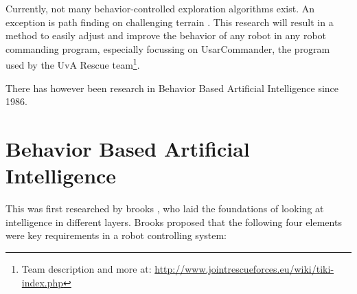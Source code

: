 \documentclass[a4paper,10pt]{article}
\begin{document}
Currently, not many behavior-controlled exploration algorithms exist.
An exception is path finding on challenging terrain
\cite{seraji2002behavior} . This research will result in a method to
easily adjust and improve the behavior of any robot in any robot commanding
program, especially focussing on UsarCommander, the program used by the UvA Rescue
team\footnote{Team description and more at: \url{http://www.jointrescueforces.eu/wiki/tiki-index.php}}.

There has however been research in Behavior Based Artificial Intelligence since
1986.

\section{Behavior Based Artificial Intelligence}
This was first researched by brooks \cite{brooks1986robust}, who laid the
foundations of looking at intelligence in different layers. Brooks proposed that
the following four elements were key requirements in a robot controlling system:
\end{document}
